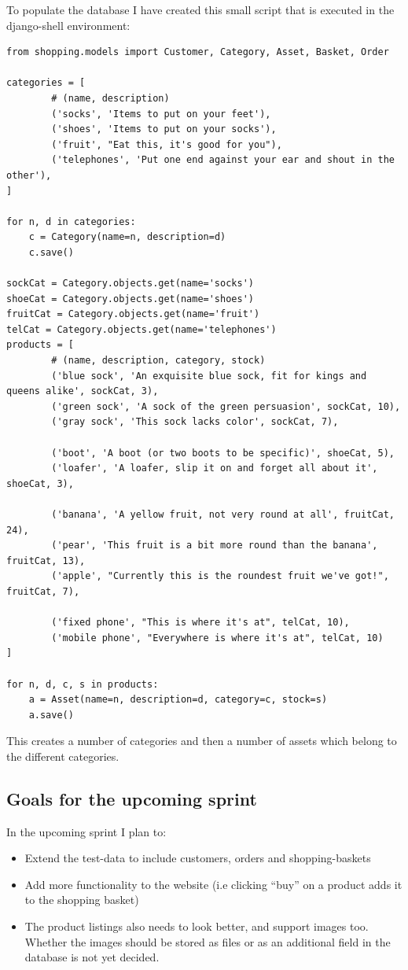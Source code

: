 \documentclass[12pt, a4paper,titlepage]{article}
\begin{document}
To populate the database I have created this small script that is executed in the
django-shell environment:
\lstset{language=Python}
\begin{lstlisting}
from shopping.models import Customer, Category, Asset, Basket, Order

categories = [ 
        # (name, description)
        ('socks', 'Items to put on your feet'),
        ('shoes', 'Items to put on your socks'),
        ('fruit', "Eat this, it's good for you"),
        ('telephones', 'Put one end against your ear and shout in the other'),
]   

for n, d in categories:
    c = Category(name=n, description=d)
    c.save()

sockCat = Category.objects.get(name='socks')
shoeCat = Category.objects.get(name='shoes')
fruitCat = Category.objects.get(name='fruit')
telCat = Category.objects.get(name='telephones')
products = [ 
        # (name, description, category, stock)
        ('blue sock', 'An exquisite blue sock, fit for kings and queens alike', sockCat, 3), 
        ('green sock', 'A sock of the green persuasion', sockCat, 10),
        ('gray sock', 'This sock lacks color', sockCat, 7), 

        ('boot', 'A boot (or two boots to be specific)', shoeCat, 5), 
        ('loafer', 'A loafer, slip it on and forget all about it', shoeCat, 3), 
    
        ('banana', 'A yellow fruit, not very round at all', fruitCat, 24),
        ('pear', 'This fruit is a bit more round than the banana', fruitCat, 13),
        ('apple', "Currently this is the roundest fruit we've got!", fruitCat, 7), 

        ('fixed phone', "This is where it's at", telCat, 10),
        ('mobile phone', "Everywhere is where it's at", telCat, 10) 
]   

for n, d, c, s in products:
    a = Asset(name=n, description=d, category=c, stock=s)
    a.save()
\end{lstlisting}
This creates a number of categories and then a number of assets which
belong to the different categories.

\subsection{Goals for the upcoming sprint}
In the upcoming sprint I plan to:
\begin{itemize}
\setlength\itemsep{-5pt}
\item Extend the test-data to include customers, orders and shopping-baskets
\item Add more functionality to the website (i.e clicking ``buy'' on a product adds it to the shopping basket)
\item The product listings also needs to look better, and support images too. 
Whether the images should be stored as files or as an additional field in the
database is not yet decided.
\end{itemize}
\end{document}
